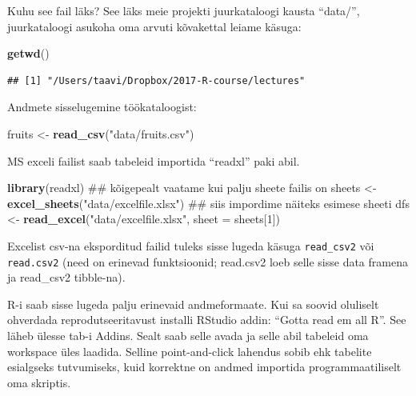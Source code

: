 \documentclass[]{book}
\newenvironment{Shaded}{\begin{snugshade}}{\end{snugshade}}
\newcommand{\KeywordTok}[1]{\textcolor[rgb]{0.13,0.29,0.53}{\textbf{#1}}}
\newcommand{\DataTypeTok}[1]{\textcolor[rgb]{0.13,0.29,0.53}{#1}}
\newcommand{\DecValTok}[1]{\textcolor[rgb]{0.00,0.00,0.81}{#1}}
\newcommand{\StringTok}[1]{\textcolor[rgb]{0.31,0.60,0.02}{#1}}
\newcommand{\NormalTok}[1]{#1}
\begin{document}
Kuhu see fail läks? See läks meie projekti juurkataloogi kausta
``data/'', juurkataloogi asukoha oma arvuti kõvakettal leiame käsuga:

\begin{Shaded}
\begin{Highlighting}[]
\KeywordTok{getwd}\NormalTok{()}
\end{Highlighting}
\end{Shaded}

\begin{verbatim}
## [1] "/Users/taavi/Dropbox/2017-R-course/lectures"
\end{verbatim}

Andmete sisselugemine töökataloogist:

\begin{Shaded}
\begin{Highlighting}[]
\NormalTok{fruits <-}\StringTok{  }\KeywordTok{read_csv}\NormalTok{(}\StringTok{"data/fruits.csv"}\NormalTok{)}
\end{Highlighting}
\end{Shaded}

MS exceli failist saab tabeleid importida ``readxl'' paki abil.

\begin{Shaded}
\begin{Highlighting}[]
\KeywordTok{library}\NormalTok{(readxl)}
\NormalTok{## kõigepealt vaatame kui palju sheete failis on}
\NormalTok{sheets <-}\StringTok{ }\KeywordTok{excel_sheets}\NormalTok{(}\StringTok{"data/excelfile.xlsx"}\NormalTok{)}
\NormalTok{## siis impordime näiteks esimese sheeti}
\NormalTok{dfs <-}\StringTok{ }\KeywordTok{read_excel}\NormalTok{(}\StringTok{"data/excelfile.xlsx"}\NormalTok{, }\DataTypeTok{sheet =}\NormalTok{ sheets[}\DecValTok{1}\NormalTok{])}
\end{Highlighting}
\end{Shaded}

Excelist csv-na eksporditud failid tuleks sisse lugeda käsuga
\texttt{read\_csv2} või \texttt{read.csv2} (need on erinevad
funktsioonid; read.csv2 loeb selle sisse data framena ja read\_csv2
tibble-na).

R-i saab sisse lugeda palju erinevaid andmeformaate. Kui sa soovid
oluliselt ohverdada reprodutseeritavust installi RStudio addin: ``Gotta
read em all R''. See läheb ülesse tab-i Addins. Sealt saab selle avada
ja selle abil tabeleid oma workspace üles laadida. Selline
point-and-click lahendus sobib ehk tabelite esialgseks tutvumiseks, kuid
korrektne on andmed importida programmaatiliselt oma skriptis.
\end{document}
